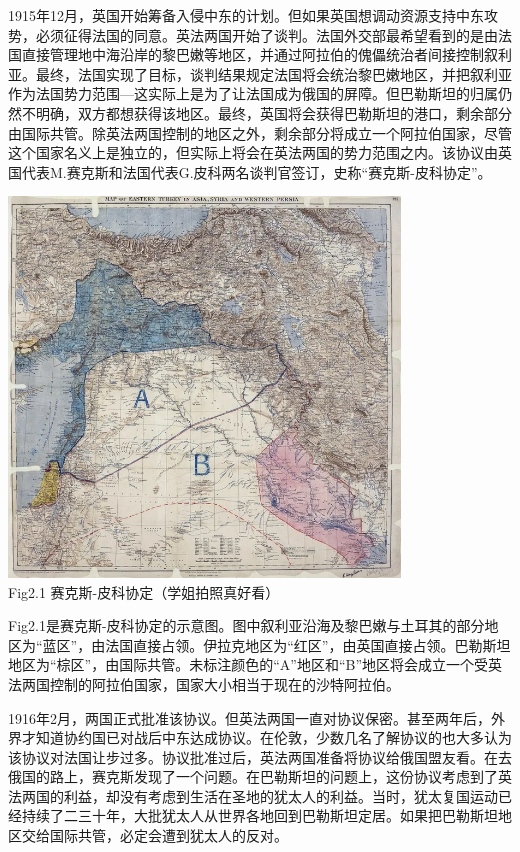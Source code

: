 \documentclass{article}
\begin{document}
1915年12月，英国开始筹备入侵中东的计划。但如果英国想调动资源支持中东攻势，必须征得法国的同意。英法两国开始了谈判。法国外交部最希望看到的是由法国直接管理地中海沿岸的黎巴嫩等地区，并通过阿拉伯的傀儡统治者间接控制叙利亚。最终，法国实现了目标，谈判结果规定法国将会统治黎巴嫩地区，并把叙利亚作为法国势力范围---这实际上是为了让法国成为俄国的屏障。但巴勒斯坦的归属仍然不明确，双方都想获得该地区。最终，英国将会获得巴勒斯坦的港口，剩余部分由国际共管。除英法两国控制的地区之外，剩余部分将成立一个阿拉伯国家，尽管这个国家名义上是独立的，但实际上将会在英法两国的势力范围之内。该协议由英国代表M.赛克斯和法国代表G.皮科两名谈判官签订，史称“赛克斯-皮科协定”。
\begin{center}
    \includegraphics[width=10.4cm]{zd.jpg}\\
    Fig2.1 赛克斯-皮科协定（学姐拍照真好看）
    \label{fig:Fig2.1}
\end{center}
\clearpage
Fig2.1是赛克斯-皮科协定的示意图。图中叙利亚沿海及黎巴嫩与土耳其的部分地区为“蓝区”，由法国直接占领。伊拉克地区为“红区”，由英国直接占领。巴勒斯坦地区为“棕区”，由国际共管。未标注颜色的“A”地区和“B”地区将会成立一个受英法两国控制的阿拉伯国家，国家大小相当于现在的沙特阿拉伯。

1916年2月，两国正式批准该协议。但英法两国一直对协议保密。甚至两年后，外界才知道协约国已对战后中东达成协议。在伦敦，少数几名了解协议的也大多认为该协议对法国让步过多。协议批准过后，英法两国准备将协议给俄国盟友看。在去俄国的路上，赛克斯发现了一个问题。在巴勒斯坦的问题上，这份协议考虑到了英法两国的利益，却没有考虑到生活在圣地的犹太人的利益。当时，犹太复国运动已经持续了二三十年，大批犹太人从世界各地回到巴勒斯坦定居。如果把巴勒斯坦地区交给国际共管，必定会遭到犹太人的反对。
\end{document}
